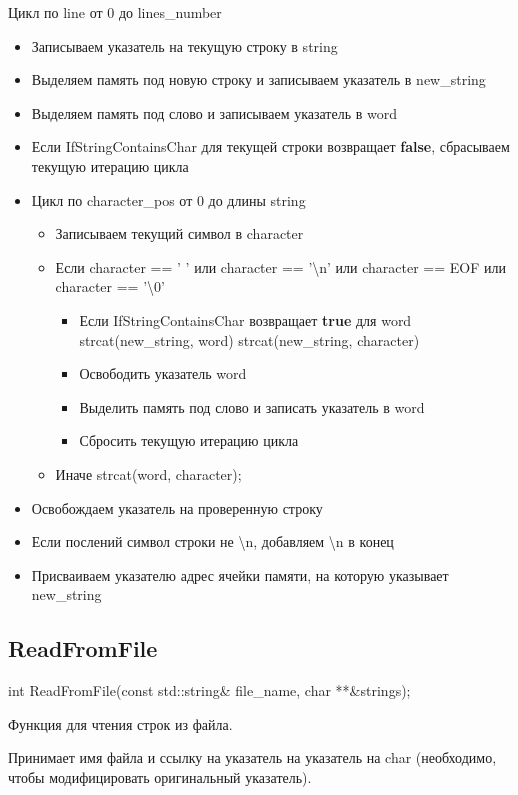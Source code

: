 \documentclass[12pt,a4paper]{article}  %
\begin{document}
	Цикл по line от 0 до lines\_number
		\begin{itemize}
			\item Записываем указатель на текущую строку в string
			\item Выделяем память под новую строку и записываем указатель в new\_string
			\item Выделяем память под слово и записываем указатель в word
			\item Если IfStringContainsChar для текущей строки возвращает \textbf{false}, сбрасываем текущую итерацию цикла
			\item Цикл по character\_pos от 0 до длины string
			\begin{itemize}
				\item Записываем текущий символ в character
				\item Если character == ' ' или character == '\textbackslash n' или character == EOF или character == '\textbackslash 0'
				\begin{itemize}
					\item Если IfStringContainsChar возвращает \textbf{true} для word
					\subitem strcat(new\_string, word)
					\subitem strcat(new\_string, character)
					\item Освободить указатель word
					\item Выделить память под слово и записать указатель в word
					\item Сбросить текущую итерацию цикла
				\end{itemize}
				\item Иначе
				\subitem strcat(word, character);
			\end{itemize}
		\item Освобождаем указатель на проверенную строку
		\item Если послений символ строки не \textbackslash n, добавляем \textbackslash n в конец
		\item Присваиваем указателю адрес ячейки памяти, на которую указывает new\_string
		\end{itemize}
	
	\fi
	
	\subsection*{ReadFromFile}
	int ReadFromFile(const std::string\& file\_name, char **\&strings);
	
	Функция для чтения строк из файла. 
	
	Принимает имя файла и ссылку на указатель на указатель на char (необходимо, чтобы модифицировать оригинальный указатель). 
	
\end{document}
